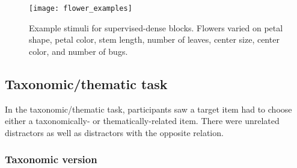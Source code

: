\documentclass[../dissertation.tex]{subfiles}
\begin{document}
\begin{figure}[H]
\begin{center}
\texttt{[image: flower\_examples]}
\caption[Example stimuli for supervised-dense blocks]{Example stimuli for supervised-dense blocks. Flowers varied on petal shape, petal color, stem length, number of leaves, center size, center color, and number of bugs.}
\vspace{-10pt}
\label{flowers}
\end{center}
\end{figure}

\subsection{Taxonomic/thematic task}

In the taxonomic/thematic task, participants saw a target item had to choose either a taxonomically- or thematically-related item. There were unrelated distractors as well as distractors with the opposite relation.

\subsubsection{Taxonomic version}
\end{document}
